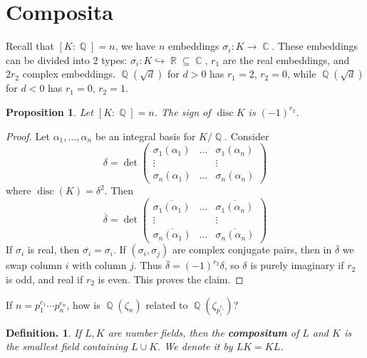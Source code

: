 \documentclass[11pt, a4paper]{memoir}
\DeclareMathOperator{\Q}{{\mathbb{Q}}}
\DeclareMathOperator{\R}{{\mathbb{R}}}
\DeclareMathOperator{\C}{{\mathbb{C}}}
\theoremstyle{change}
\newtheorem{proposition}[theorem]{Proposition}
\theoremstyle{plain}
\theoremstyle{nonumberplain}
\newtheorem{definition}{Definition.}
\newtheorem{proof}{Proof}
\DeclareMathOperator{\disc}{disc}
\begin{document}
\section{Composita}
Recall that $[K:\Q]=n$, we have $n$ embeddings $\sigma_i:K\to\C$.
These embeddings can be divided into 2 types: $\sigma_i:K\hookrightarrow\R\subseteq \C$, $r_1$ are the real embeddings, and $2r_2$ complex embeddings.
$\Q(\sqrt{d})$ for $d>0$ has $r_1=2$, $r_2=0$, while $\Q(\sqrt{d})$ for $d<0$ has $r_1=0$, $r_2=1$.
\begin{proposition}
    Let $[K:\Q]=n$.
    The sign of $\disc K$ is $(-1)^{r_2}$.
\end{proposition}
\begin{proof}
    Let $\alpha_1,\ldots,\alpha_n$ be an integral basis for $K/\Q$.
    Consider
    \begin{equation*}
        \delta=\det
        \begin{pmatrix}
            \sigma_1(\alpha_1)&\hdots&\sigma_1(\alpha_n)\\
            \vdots&&\vdots\\
            \sigma_n(\alpha_1)&\hdots&\sigma_n(\alpha_n)
        \end{pmatrix}
    \end{equation*}
    where $\disc(K)=\delta^2$.
    Then
    \begin{equation*}
        \overline{\delta}=\det
        \begin{pmatrix}
            \overline{\sigma_1(\alpha_1)}&\hdots&\overline{\sigma_1(\alpha_n)}\\
            \vdots&&\vdots\\
            \overline{\sigma_n(\alpha_1)}&\hdots&\overline{\sigma_n(\alpha_n)}
        \end{pmatrix}
    \end{equation*}
    If $\sigma_i$ is real, then $\overline{\sigma_i}=\sigma_i$.
    If $(\sigma_i,\sigma_j)$ are complex conjugate pairs, then in $\overline{\delta}$ we swap column $i$ with column $j$.
    Thus $\overline{\delta}=(-1)^{r_2}\delta$, so $\delta$ is purely imaginary if $r_2$ is odd, and real if $r_2$ is even.
    This proves the claim.
\end{proof}
If $n=p_1^{e_1}\cdots p_n^{e_n}$, how is $\Q(\zeta_n)$ related to $\Q(\zeta_{p_i^{e_i}})$?
\begin{definition}
    If $L,K$ are number fields, then the \textbf{compositum} of $L$ and $K$ is the smallest field containing $L\cup K$.
    We denote it by $LK=KL$.
\end{definition}
\end{document}
